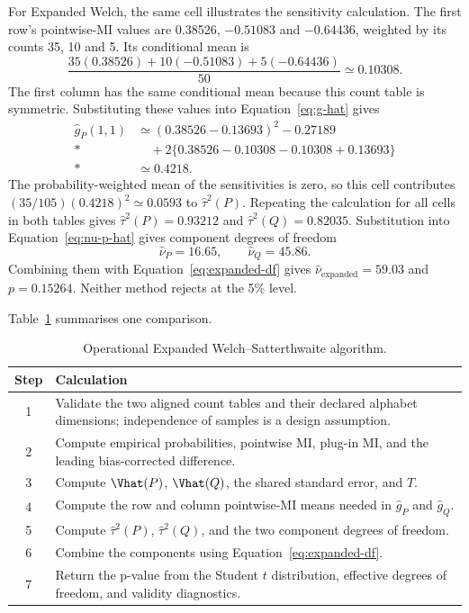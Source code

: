 For Expanded Welch, the same cell illustrates the sensitivity calculation.
The first row's pointwise-MI values are 0.38526, \(-0.51083\) and
\(-0.64436\), weighted by its counts 35, 10 and 5. Its conditional mean is
\begin{equation*}
 \frac{35(0.38526)+10(-0.51083)+5(-0.64436)}{50}
 \simeq0.10308.
\end{equation*}
The first column has the same conditional mean because this count table is
symmetric. Substituting these values into Equation~\eqref{eq:g-hat} gives
\begin{align*}
 \widehat g_P(1,1)
 &\simeq (0.38526-0.13693)^2-0.27189\\*
 &\quad+2\{0.38526-0.10308-0.10308+0.13693\}\\*
 &\simeq0.4218.
\end{align*}
The probability-weighted mean of the sensitivities is zero, so this cell
contributes \((35/105)(0.4218)^2\simeq0.0593\) to
\(\widehat\tau^2(P)\). Repeating the calculation for all cells in both
tables gives \(\widehat\tau^2(P)=0.93212\) and
\(\widehat\tau^2(Q)=0.82035\). Substitution into
Equation~\eqref{eq:nu-p-hat} gives component degrees of freedom
\begin{equation}
  \widehat\nu_P=16.65,
  \qquad
  \widehat\nu_Q=45.86.
\end{equation}
Combining them with Equation~\eqref{eq:expanded-df} gives
\(\widehat\nu_{\mathrm{expanded}}=59.03\) and \(p=0.15264\).
Neither method rejects at the 5\% level.

\pagebreak[3]
\medskip
{}
\label{sec:expanded-complexity}

Table~\ref{tab:expanded-algorithm} summarises one comparison.

\begin{table}[htbp]
\centering
\caption{Operational Expanded Welch--Satterthwaite algorithm.}
\label{tab:expanded-algorithm}
\begin{tabularx}{\textwidth}{@{}cX@{}}
\toprule
Step & Calculation \\
\midrule
1 & Validate the two aligned count tables and their declared alphabet dimensions; independence of samples is a design assumption. \\
2 & Compute empirical probabilities, pointwise MI, plug-in MI, and the leading bias-corrected difference. \\
3 & Compute \(\Vhat(P)\), \(\Vhat(Q)\), the shared standard error, and \(T\). \\
4 & Compute the row and column pointwise-MI means needed in \(\widehat g_P\) and \(\widehat g_Q\). \\
5 & Compute \(\widehat\tau^2(P)\), \(\widehat\tau^2(Q)\), and the two component degrees of freedom. \\
6 & Combine the components using Equation~\eqref{eq:expanded-df}. \\
7 & Return the p-value from the Student \(t\) distribution, effective degrees of freedom, and validity diagnostics. \\
\bottomrule
\end{tabularx}
\end{table}

